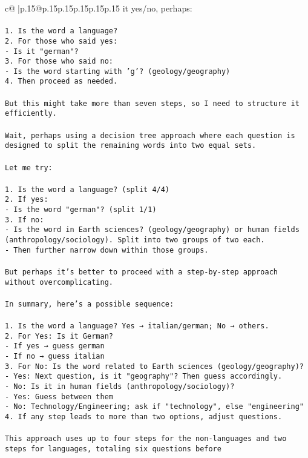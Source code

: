 \documentclass{article}
\begin{document}
{\begin{supertabular}{c@{$\;$}|p{.15\linewidth}@{}p{.15\linewidth}p{.15\linewidth}p{.15\linewidth}p{.15\linewidth}p{.15\linewidth}}
{{{it yes/no, perhaps:\\ \tt \\ \tt 1. Is the word a language?\\ \tt 2. For those who said yes:\\ \tt    - Is it "german"?\\ \tt 3. For those who said no:\\ \tt    - Is the word starting with 'g'? (geology/geography)\\ \tt 4. Then proceed as needed.\\ \tt \\ \tt But this might take more than seven steps, so I need to structure it efficiently.\\ \tt \\ \tt Wait, perhaps using a decision tree approach where each question is designed to split the remaining words into two equal sets.\\ \tt \\ \tt Let me try:\\ \tt \\ \tt 1. Is the word a language? (split 4/4)\\ \tt 2. If yes:\\ \tt    - Is the word "german"? (split 1/1)\\ \tt 3. If no:\\ \tt    - Is the word in Earth sciences? (geology/geography) or human fields (anthropology/sociology). Split into two groups of two each.\\ \tt    - Then further narrow down within those groups.\\ \tt \\ \tt But perhaps it's better to proceed with a step-by-step approach without overcomplicating.\\ \tt \\ \tt In summary, here's a possible sequence:\\ \tt \\ \tt 1. Is the word a language? Yes → italian/german; No → others.\\ \tt 2. For Yes: Is it German?\\ \tt    - If yes → guess german\\ \tt    - If no → guess italian\\ \tt 3. For No: Is the word related to Earth sciences (geology/geography)?\\ \tt    - Yes: Next question, is it "geography"? Then guess accordingly.\\ \tt    - No: Is it in human fields (anthropology/sociology)?\\ \tt      - Yes: Guess between them\\ \tt      - No: Technology/Engineering; ask if "technology", else "engineering"\\ \tt 4. If any step leads to more than two options, adjust questions.\\ \tt \\ \tt This approach uses up to four steps for the non-languages and two steps for languages, totaling six questions before }}}
\end{supertabular}}
\end{document}
